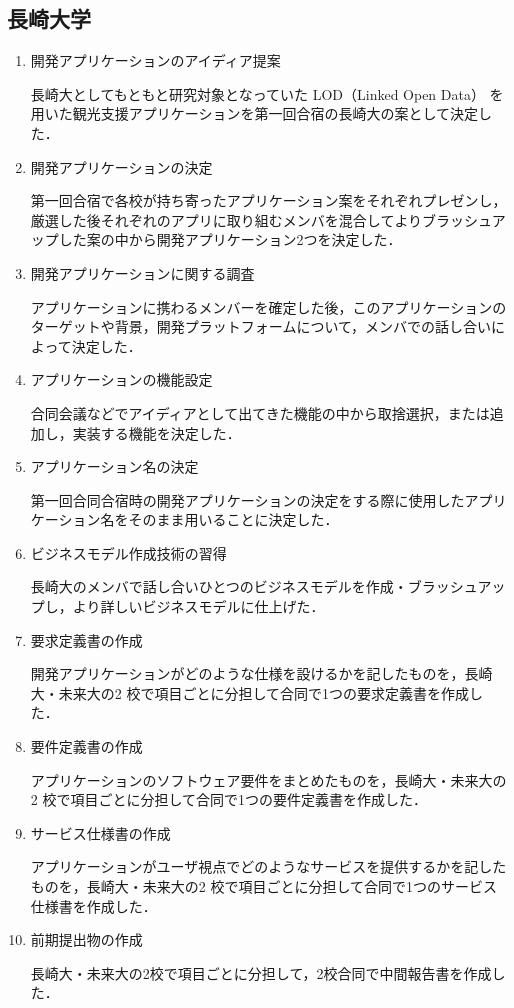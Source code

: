 \subsection{長崎大学}
\begin{enumerate}
\item 開発アプリケーションのアイディア提案 
\par 長崎大としてもともと研究対象となっていた LOD（Linked Open Data） を用いた観光支援アプリケーションを第一回合宿の長崎大の案として決定した．
\item 開発アプリケーションの決定 
\par 第一回合宿で各校が持ち寄ったアプリケーション案をそれぞれプレゼンし，厳選した後それぞれのアプリに取り組むメンバを混合してよりブラッシュアップした案の中から開発アプリケーション2つを決定した． 
\item 開発アプリケーションに関する調査 
\par  アプリケーションに携わるメンバーを確定した後，このアプリケーションのターゲットや背景，開発プラットフォームについて，メンバでの話し合いによって決定した．
\item アプリケーションの機能設定 
\par 合同会議などでアイディアとして出てきた機能の中から取捨選択，または追加し，実装する機能を決定した． 
\item アプリケーション名の決定 
\par 第一回合同合宿時の開発アプリケーションの決定をする際に使用したアプリケーション名をそのまま用いることに決定した．
\item ビジネスモデル作成技術の習得 
\par 長崎大のメンバで話し合いひとつのビジネスモデルを作成・ブラッシュアップし，より詳しいビジネスモデルに仕上げた．
\item 要求定義書の作成 
\par 開発アプリケーションがどのような仕様を設けるかを記したものを，長崎大・未来大の2 校で項目ごとに分担して合同で1つの要求定義書を作成した． 
\item 要件定義書の作成 
\par アプリケーションのソフトウェア要件をまとめたものを，長崎大・未来大の2 校で項目ごとに分担して合同で1つの要件定義書を作成した． 
\item サービス仕様書の作成 
\par アプリケーションがユーザ視点でどのようなサービスを提供するかを記したものを，長崎大・未来大の2 校で項目ごとに分担して合同で1つのサービス仕様書を作成した．
\item 前期提出物の作成 
\par 長崎大・未来大の2校で項目ごとに分担して，2校合同で中間報告書を作成した．
\end{enumerate}
